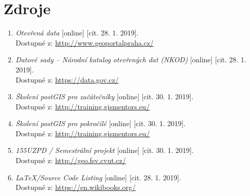 \documentclass[a4paper, 12pt]{article}
\begin{document}
\section{Zdroje}
\begin{enumerate}
\item  \textsl{Otevřená data} [online] [cit. 28. 1. 2019].\\
Dostupné z: \href{http://www.geoportalpraha.cz/cs/opendata?fbclid=IwAR3dvAz20d2Anu-nuD9A7wC3byHUKTzDGTnlgQrmi0tC-t-SbSqN7Q5x-sA#.XE8ymWlCfIX}{http://www.geoportalpraha.cz/}

\item  \textsl{Datové sady – Národní katalog otevřených dat (NKOD)} [online] [cit. 28. 1. 2019].\\
Dostupné z: \href{https://data.gov.cz/datov\%C3\%A9-sady?dotaz=&fbclid=IwAR2jg2NvnsjO7BuHAgbXSJwh6VXFbsuXs0FONcle5ZfdPpO86Z_2C3YUQsU}{https://data.gov.cz/}

\item  \textsl{Školení postGIS pro začátečníky} [online] [cit. 30. 1. 2019].\\
Dostupné z: \href{http://training.gismentors.eu/postgis-zacatecnik/}{http://training.gismentors.eu/}

\item  \textsl{Školení postGIS pro pokročilé} [online] [cit. 30. 1. 2019].\\
Dostupné z: \href{http://training.gismentors.eu/postgis-pokrocily/}{http://training.gismentors.eu/}

\item  \textsl{155UZPD / Semestrální projekt} [online] [cit. 30. 1. 2019].\\
Dostupné z: \href{http://geo.fsv.cvut.cz/gwiki/155UZPD_/_Semestr%C3%A1ln%C3%AD_projekt}{http://geo.fsv.cvut.cz/}

\item  \textsl{LaTeX/Source Code Listing} [online] [cit. 28. 1. 2019].\\
Dostupné z: \href{https://en.wikibooks.org/wiki/LaTeX/Source_Code_Listings}{https://en.wikibooks.org/}

\end{enumerate}
\end{document}
